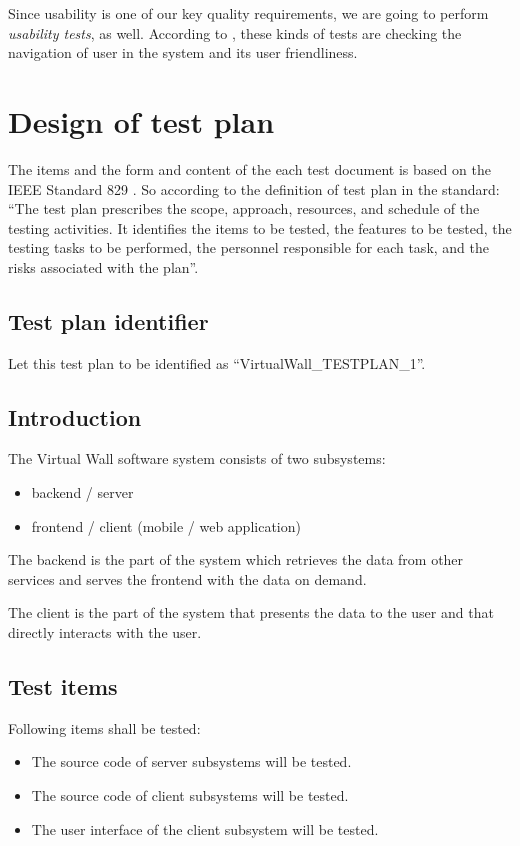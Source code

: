 \documentclass[11pt]{book}
\begin{document}
Since usability is one of our key quality requirements, we are going to perform \emph{usability tests}, as well. According to \cite{shinde}, these kinds of tests are checking the navigation of user in the system and its user friendliness.

\section{Design of test plan}

The items and the form and content of the each test document is based on the IEEE Standard 829 \cite{ieee829}. So according to the definition of test plan in the standard: ``The test plan prescribes the scope, approach, resources, and schedule of the testing activities. It identifies the items to be tested, the features to be tested, the testing tasks to be performed, the personnel responsible for each task, and the risks associated with the plan''.

\subsection{Test plan identifier}
Let this test plan to be identified as ``VirtualWall\_TESTPLAN\_1''.

\subsection{Introduction}
The Virtual Wall software system consists of two subsystems:

\begin{itemize}
    \item backend / server
    \item frontend / client (mobile / web application)
\end{itemize}

The backend is the part of the system which retrieves the data from other services and serves the frontend with the data on demand.

The client is the part of the system that presents the data to the user and that directly interacts with the user.

\subsection{Test items}
Following items shall be tested:

\begin{itemize}
    \item The source code of server subsystems will be tested.
    \item The source code of client subsystems will be tested.
    \item The user interface of the client subsystem will be tested.
\end{itemize}
\end{document}
